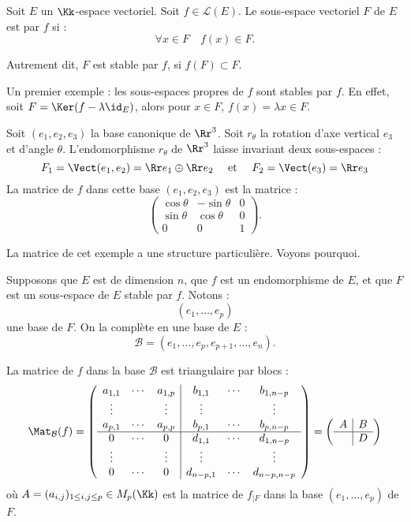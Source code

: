 \documentclass[12pt, class=report,crop=false]{standalone}
\begin{document}
\begin{definition}
Soit $E$ un $\Kk$-espace vectoriel. Soit $f \in \mathcal{L}(E)$. 
Le sous-espace vectoriel $F$ de $E$ est  par $f$ si :
\[\forall x \in F \quad f(x) \in F .\]
\end{definition}


Autrement dit, $F$ est stable par $f$, si $f(F) \subset F$.

Un premier exemple : les sous-espaces propres de $f$ sont stables par $f$.
En effet, soit $F = \Ker(f-\lambda \id_E)$, alors pour $x \in F$, $f(x) = \lambda x \in F$.



\begin{exemple}
\label{ex:polyendorot}
Soit $(e_1,e_2,e_3)$ la base canonique de $\Rr^3$. Soit $r_\theta$ la rotation d'axe vertical $e_3$ et d'angle $\theta$. L'endomorphisme $r_\theta$ de $\Rr^3$ laisse invariant deux sous-espaces :
\[F_1 = \Vect(e_1,e_2) = \Rr e_1 \oplus \Rr e_2 \quad \text{ et } \quad  F_2 = \Vect(e_3) = \Rr e_3\]
La matrice de $f$ dans cette base $(e_1,e_2,e_3)$ est la matrice :
\[\begin{pmatrix}
\cos \theta & -\sin \theta& 0\\
\sin \theta & \cos \theta & 0\\
0&0&1
\end{pmatrix}.\]
\end{exemple}

La matrice de cet exemple a une structure particulière. Voyons pourquoi.

\bigskip


Supposons que $E$ est de dimension $n$, que $f$ est un endomorphisme de $E$, et que $F$ est un sous-espace de $E$ stable par $f$. Notons :
\[(e_1,\ldots,e_p)\]
une base de $F$. On la complète en une base de $E$ :
\[\mathcal{B} = (e_1,\ldots,e_p,e_{p+1},\ldots,e_n).\]

La matrice de $f$ dans la base $\mathcal{B}$ est triangulaire par blocs :
\[\Mat_{\mathcal{B}}(f)  = 
\left(\begin{array}{ccc|ccc}
a_{1,1}&\cdots&a_{1,p}&b_{1,1}&\cdots&b_{1,n-p}\\
\vdots&&\vdots&\vdots&&\vdots\\
a_{p,1}&\cdots&a_{p,p}&b_{p,1}&\cdots&b_{p,n-p}\\ \hline
0 &\cdots&0&d_{1,1}&\cdots&d_{1,n-p}\\
\vdots&&\vdots&\vdots&&\vdots\\
0&\cdots&0&d_{n-p,1}&\cdots&d_{n-p,n-p}
\end{array}\right)
=
\left(\begin{array}{c|c}
A & B\\ \hline
  & D\\
\end{array}\right)
\]
où $A=(a_{i,j})_{1 \le i,j \le p}\in M_p(\Kk)$ est la matrice de $f_{|F}$ dans la base $(e_1,\ldots,e_p)$ de $F$.
\end{document}
